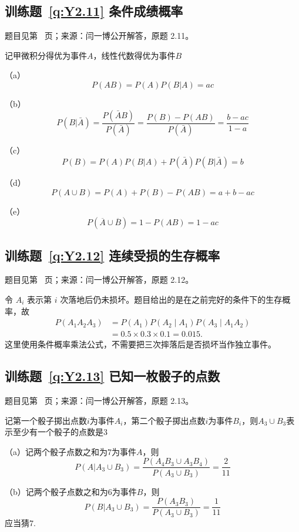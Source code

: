 \documentclass[UTF8,12pt,a4paper,fontset=fandol]{ctexbook}
\begin{document}
\subsection*{训练题~\ref{q:Y2.11} 条件成绩概率}\label{a:Y2.11}{\small 题目见第~\pageref{q:Y2.11} 页；来源：闫一博公开解答，原题 2.11。}
\begin{solve}
记甲微积分得优为事件$A$，线性代数得优为事件$B$

（a）
\[P(AB) = P(A)P(B|A) = ac\]

（b）\[P(B|\bar A) = \frac{{P(\bar AB)}}{{P(\bar A)}} = \frac{{P(B) - P(AB)}}{{P(\bar A)}} = \frac{{b - ac}}{{1 - a}}\]

（c）
\[P(B) = P(A)P(B|A) + P(\bar A)P(B|\bar A) = b\]

（d）
\[P(A \cup B) = P(A) + P(B) - P(AB) = a + b - ac\]

（e）
\[P(\overline A  \cup \overline B ) = 1 - P(AB) = 1 - ac\]
\end{solve}

\subsection*{训练题~\ref{q:Y2.12} 连续受损的生存概率}\label{a:Y2.12}{\small 题目见第~\pageref{q:Y2.12} 页；来源：闫一博公开解答，原题 2.12。}
\begin{solve}令 $A_i$ 表示第 $i$ 次落地后仍未损坏。题目给出的是在之前完好的条件下的生存概率，故\[\begin{aligned}P(A_1A_2A_3)&=P(A_1)P(A_2\mid A_1)P(A_3\mid A_1A_2)\\&=0.5\times0.3\times0.1=0.015.\end{aligned}\]这里使用条件概率乘法公式，不需要把三次摔落后是否损坏当作独立事件。\end{solve}

\subsection*{训练题~\ref{q:Y2.13} 已知一枚骰子的点数}\label{a:Y2.13}{\small 题目见第~\pageref{q:Y2.13} 页；来源：闫一博公开解答，原题 2.13。}
\begin{solve}
记第一个骰子掷出点数$i$为事件$A_i$，第二个骰子掷出点数$i$为事件$B_i$，则$A_3\cup B_3$表示至少有一个骰子的点数是$3$

（a）记两个骰子点数之和为$7$为事件$A$，则
\[P(A|{A_3} \cup {B_3}) = \frac{{P({A_4}{B_3} \cup {A_3}{B_4})}}{{P({A_3} \cup {B_3})}} = \frac{2}{{11}}\]

（b）记两个骰子点数之和为$6$为事件$B$，则
\[P(B|{A_3} \cup {B_3}) = \frac{{P({A_3}{B_3})}}{{P({A_3} \cup {B_3})}} = \frac{1}{{11}}\]
应当猜$7$.
\end{solve}
\end{document}
